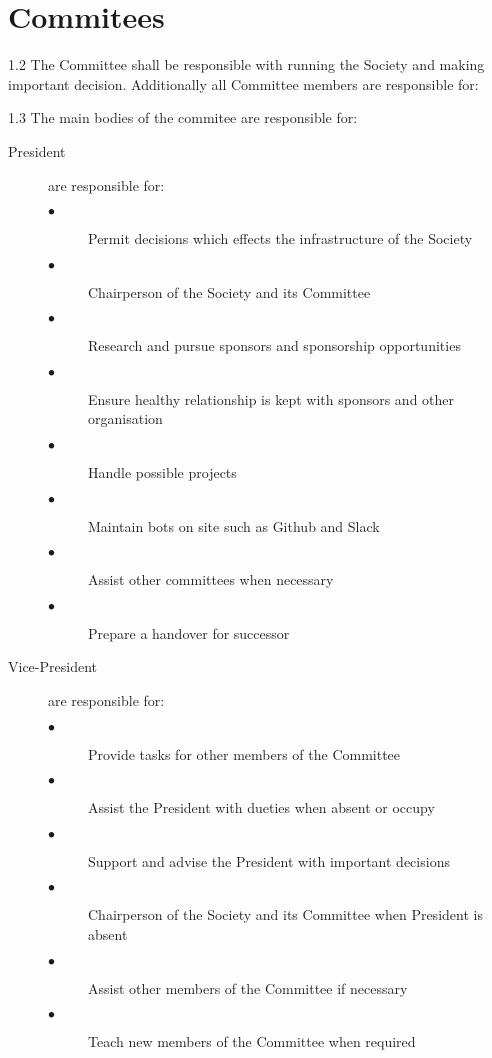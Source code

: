 \documentclass[10pt, a4paper, onecolumn]{report}
\begin{document}
  \section{Commitees}
  
  1.2 The Committee shall be responsible with running the Society and making important decision. Additionally all Committee members are responsible for:
  
  1.3 The main bodies of the commitee are responsible for:
  
  \begin{description}

    \item[President] are responsible for:
      \begin{description}
        \item[$\bullet$] Permit decisions which effects the infrastructure of the Society
        \item[$\bullet$] Chairperson of the Society and its Committee
        \item[$\bullet$] Research and pursue sponsors and sponsorship opportunities
        \item[$\bullet$] Ensure healthy relationship is kept with sponsors and
        other organisation
        \item[$\bullet$] Handle possible projects
        \item[$\bullet$] Maintain bots on site such as Github and Slack
        \item[$\bullet$] Assist other committees when necessary 
        \item[$\bullet$] Prepare a handover for successor
      \end{description}

    \item[Vice-President] are responsible for: 
     \begin{description}
        \item[$\bullet$] Provide tasks for other members of the Committee
        \item[$\bullet$] Assist the President with dueties when absent or occupy 
        \item[$\bullet$] Support and advise the President with important decisions
        \item[$\bullet$] Chairperson of the Society and its Committee when 
        President is absent
        \item[$\bullet$] Assist other members of the Committee if necessary
        \item[$\bullet$] Teach new members of the Committee when required
      \end{description}


\end{description}
\end{document}
